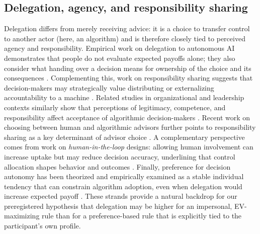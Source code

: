 \documentclass[a4paper, 12pt, fleqn]{article}
\theoremstyle{definition}
\begin{document}
\subsection{Delegation, agency, and responsibility sharing}
Delegation differs from merely receiving advice: it is a choice to transfer control to another actor (here, an algorithm) and is therefore closely tied to perceived agency and responsibility. Empirical work on delegation to autonomous AI demonstrates that people do not evaluate expected payoffs alone; they also consider what handing over a decision means for ownership of the choice and its consequences \citep{Candrian2022}. Complementing this, work on responsibility sharing suggests that decision-makers may strategically value distributing or externalizing accountability to a machine \citep{Kirchkamp2019}. Related studies in organizational and leadership contexts similarly show that perceptions of legitimacy, competence, and responsibility affect acceptance of algorithmic decision-makers \citep{Hoeddinghaus2021}. Recent work on choosing between human and algorithmic advisors further points to responsibility sharing as a key determinant of advisor choice \citep{Gazit2023}. A complementary perspective comes from work on \emph{human-in-the-loop} designs: allowing human involvement can increase uptake but may reduce decision accuracy, underlining that control allocation shapes behavior and outcomes \citep{Sele2024}. Finally, preference for decision autonomy has been theorized and empirically examined as a stable individual tendency that can constrain algorithm adoption, even when delegation would increase expected payoff \citep{Ivanova-Stenzel2025}. These strands provide a natural backdrop for our preregistered hypothesis that delegation may be higher for an impersonal, EV-maximizing rule than for a preference-based rule that is explicitly tied to the participant's own profile.
\end{document}
